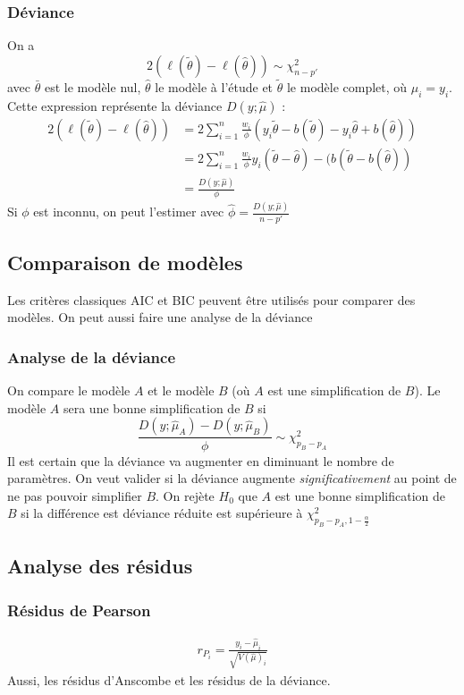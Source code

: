\documentclass[10pt, french]{article}
\begin{document}
\begin{multicols*}{3}
\subsubsection*{Déviance}
On a
\[2(\ell(\tilde{\theta}) - \ell(\hat{\theta}))  \sim \chi_{n-p'}^2 \]
avec $\bar{\theta}$ est le modèle nul, $\hat{\theta}$ le modèle à l'étude et $\tilde{\theta}$ le modèle complet, où $\hat{\mu}_i = y_i$. Cette expression représente la déviance $D(y ; \hat{\mu})$ : 
\begin{align*}
2(\ell(\tilde{\theta}) - \ell(\hat{\theta}))	& = 2 \sum_{i=1}^{n} \frac{w_i}{\phi} (y_i \tilde{\theta} - b(\tilde{\theta}) - y_i \hat{\theta} + b(\hat{\theta})) \\
&= 2 \sum_{i=1}^{n} \frac{w_i}{\phi} y_i (\tilde{\theta} - \hat{\theta}) - (b(\tilde{\theta} - b(\hat{\theta})) \\
& = \frac{D(y ; \hat{\mu})}{\phi}
\end{align*}
Si $\phi$ est inconnu, on peut l'estimer avec $\hat{\phi} = \frac{D(y ; \hat{\mu})}{n-p'}$

\subsection*{Comparaison de modèles}
Les critères classiques AIC et BIC peuvent être utilisés pour comparer des modèles. On peut aussi faire une analyse de la déviance

\subsubsection*{Analyse de la déviance}
\label{sssec:analyse_deviance}
On compare le modèle $A$ et le modèle $B$ (où $A$ est une simplification de $B$). Le modèle $A$ sera une bonne simplification de $B$ si
\[\frac{D(y ; \hat{\mu}_A) - D(y ; \hat{\mu}_B)}{\phi}  \sim \chi_{p_B - p_A}^2  \]
Il est certain que la déviance va augmenter en diminuant le nombre de paramètres. On veut valider si la déviance augmente \emph{significativement} au point de ne pas pouvoir simplifier $B$. On rejète $H_0$ que $A$ est une bonne simplification de $B$ si la différence est déviance réduite est supérieure à $\chi_{p_B - p_A, 1 - \frac{\alpha}{2}}^2$


\subsection*{Analyse des résidus}

\subsubsection*{Résidus de Pearson}
\begin{align*}
r_{P_i} = \frac{y_i - \hat{\mu}_i}{\sqrt{V(\hat{\mu})_i}}
\end{align*}
Aussi,  les résidus d'Anscombe et les résidus de la déviance.








\end{multicols*}
\end{document}
